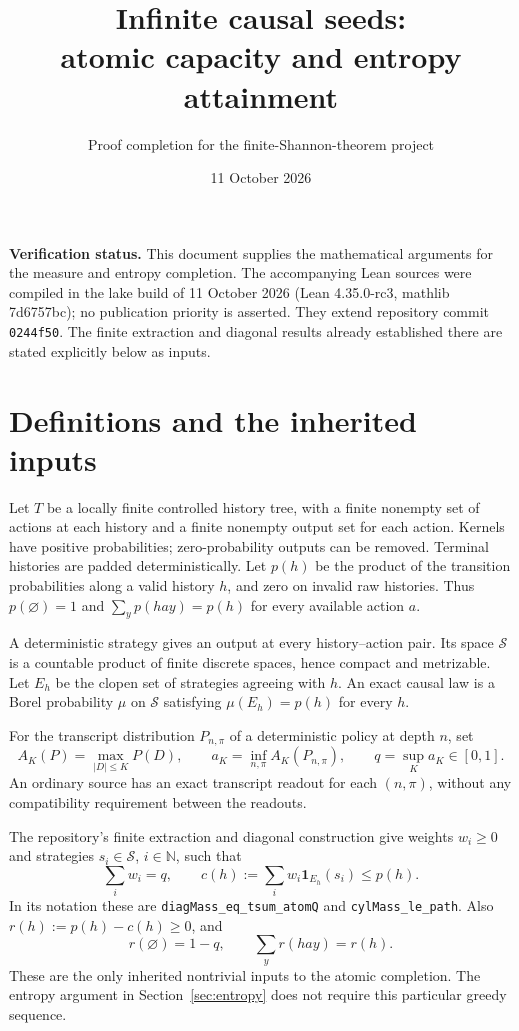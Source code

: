 \documentclass[11pt]{article}
\title{Infinite causal seeds:\\atomic capacity and entropy attainment}
\author{Proof completion for the finite-Shannon-theorem project}
\date{11 October 2026}
\newcommand{\cS}{\mathcal S}
\begin{document}
\maketitle
\noindent\textbf{Verification status.} This document supplies the mathematical arguments
for the measure and entropy completion. The accompanying Lean sources were
compiled in the lake build of 11 October 2026 (Lean 4.35.0-rc3, mathlib
7d6757bc); no publication priority is asserted. They extend repository commit
\texttt{0244f50}. The finite extraction and diagonal results already established
there are stated explicitly below as inputs.

\section{Definitions and the inherited inputs}
Let $T$ be a locally finite controlled history tree, with a finite nonempty
set of actions at each history and a finite nonempty output set for each
action. Kernels have positive probabilities; zero-probability outputs can be
removed. Terminal histories are padded deterministically. Let $p(h)$ be the
product of the transition probabilities along a valid history $h$, and zero
on invalid raw histories. Thus $p(\varnothing)=1$ and
$\sum_y p(hay)=p(h)$ for every available action $a$.

A deterministic strategy gives an output at every history--action pair.
Its space $\cS$ is a countable product of finite discrete spaces, hence compact
and metrizable. Let $E_h$ be the clopen set of strategies agreeing with $h$.
An exact causal law is a Borel probability $\mu$ on $\cS$ satisfying
$\mu(E_h)=p(h)$ for every $h$.

For the transcript distribution $P_{n,\pi}$ of a deterministic policy at
depth $n$, set
\[
 A_K(P)=\max_{|D|\le K}P(D),\qquad
 a_K=\inf_{n,\pi}A_K(P_{n,\pi}),\qquad q=\sup_K a_K\in[0,1].
\]
An ordinary source has an exact transcript readout for each $(n,\pi)$,
without any compatibility requirement between the readouts.

The repository's finite extraction and diagonal construction give weights
$w_i\ge0$ and strategies $s_i\in\cS$, $i\in\mathbb N$, such that
\begin{equation}\label{eq:input}
 \sum_iw_i=q,\qquad c(h):=\sum_iw_i\mathbf1_{E_h}(s_i)\le p(h).
\end{equation}
In its notation these are \texttt{diagMass\_eq\_tsum\_atomQ} and
\texttt{cylMass\_le\_path}. Also $r(h):=p(h)-c(h)\ge0$, and
\begin{equation}\label{eq:flow}
 r(\varnothing)=1-q,\qquad \sum_y r(hay)=r(h).
\end{equation}
These are the only inherited nontrivial inputs to the atomic completion.
The entropy argument in Section~\ref{sec:entropy} does not require this
particular greedy sequence.
\end{document}
